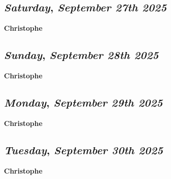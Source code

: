\def\day{\textit{September 27th 2025}}
\def\weekday{\textit{Saturday}}
\subsection*{\weekday, \day}
\textbf {Christophe}

\def\day{\textit{September 28th 2025}}
\def\weekday{\textit{Sunday}}
\subsection*{\weekday, \day}
\textbf {Christophe}

\def\day{\textit{September 29th 2025}}
\def\weekday{\textit{Monday}}
\subsection*{\weekday, \day}
\textbf {Christophe}

\def\day{\textit{September 30th 2025}}
\def\weekday{\textit{Tuesday}}
\subsection*{\weekday, \day}
\textbf {Christophe}

